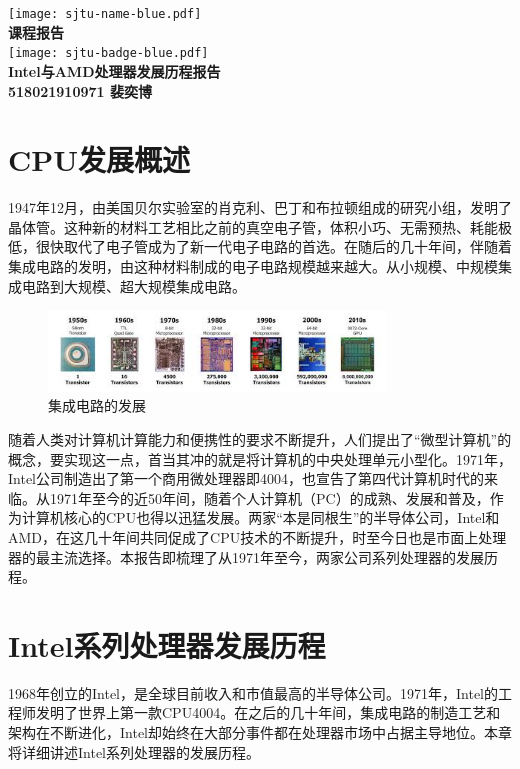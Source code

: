 \documentclass[UTF8]{ctexart}
\begin{document}
\begin{titlepage}
    \begin{center}
        \texttt{[image: sjtu-name-blue.pdf]}\\[1cm]
        \textsc{\Huge \bfseries 课程报告}\\[1.5cm]
        \texttt{[image: sjtu-badge-blue.pdf]}\\[0.5cm]

        \Huge \bfseries{Intel与AMD处理器发展历程报告}\\[1cm]
        \Large \bfseries{518021910971 裴奕博}
    \end{center}
\end{titlepage}

\tableofcontents
\newpage
\section{CPU发展概述}
1947年12月，由美国贝尔实验室的肖克利、巴丁和布拉顿组成的研究小组，发明了晶体管。这种新的材料工艺相比之前的真空电子管，体积小巧、无需预热、耗能极低，很快取代了电子管成为了新一代电子电路的首选。在随后的几十年间，伴随着集成电路的发明，由这种材料制成的电子电路规模越来越大。从小规模、中规模集成电路到大规模、超大规模集成电路。
\begin{figure}[H]
    \begin{center}
        \includegraphics[width=0.8\textwidth]{figure/ICdev.jpg}
        \caption{集成电路的发展}
    \end{center}
\end{figure}
随着人类对计算机计算能力和便携性的要求不断提升，人们提出了“微型计算机”的概念，要实现这一点，首当其冲的就是将计算机的中央处理单元小型化。1971年，Intel公司制造出了第一个商用微处理器即4004，也宣告了第四代计算机时代的来临。从1971年至今的近50年间，随着个人计算机（PC）的成熟、发展和普及，作为计算机核心的CPU也得以迅猛发展。两家“本是同根生”的半导体公司，Intel和AMD，在这几十年间共同促成了CPU技术的不断提升，时至今日也是市面上处理器的最主流选择。本报告即梳理了从1971年至今，两家公司系列处理器的发展历程。
\newpage
\section{Intel系列处理器发展历程}
1968年创立的Intel，是全球目前收入和市值最高的半导体公司。1971年，Intel的工程师发明了世界上第一款CPU4004。在之后的几十年间，集成电路的制造工艺和架构在不断进化，Intel却始终在大部分事件都在处理器市场中占据主导地位。本章将详细讲述Intel系列处理器的发展历程。
\end{document}
